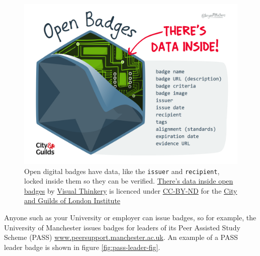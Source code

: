 \documentclass[
]{book}
\begin{document}
\begin{figure}

{\centering \includegraphics[width=1\linewidth]{images/peeled-badge} 

}

\caption{Open digital badges have data, like the \texttt{issuer} and \texttt{recipient}, locked inside them so they can be verified. \href{https://bryanmmathers.com/open-badges-data-inside/}{There's data inside open badges} by \href{https://visualthinkery.com/}{Visual Thinkery} is licenced under \href{https://creativecommons.org/licenses/by-nd/4.0/}{CC-BY-ND} for the \href{https://en.wikipedia.org/wiki/City_and_Guilds_of_London_Institute}{City and Guilds of London Institute}}\label{fig:data-inside-fig}
\end{figure}



Anyone such as your University or employer can issue badges, so for example, the University of Manchester issues badges for leaders of its Peer Assisted Study Scheme (PASS) \href{http://www.peersupport.manchester.ac.uk/}{www.peersupport.manchester.ac.uk}. An example of a PASS leader badge is shown in figure \ref{fig:pass-leader-fig}.
\end{document}
